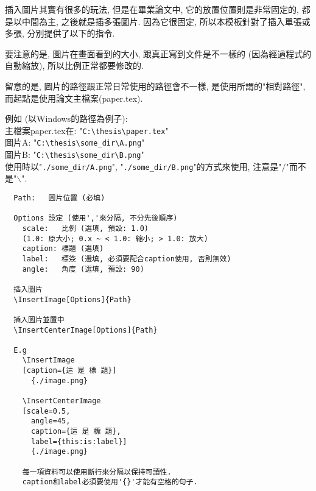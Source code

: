 

插入圖片其實有很多的玩法, 但是在畢業論文中, 它的放置位置則是非常固定的, 都是以中間為主, 之後就是插多張圖片. 因為它很固定, 所以本模板針對了插入單張或多張, 分別提供了以下的指令.

要注意的是, 圖片在畫面看到的大小, 跟真正寫到文件是不一樣的 (因為經過程式的自動縮放), 所以比例正常都要修改的.

留意的是, 圖片的路徑跟正常日常使用的路徑會不一樣, 是使用所謂的"相對路徑", 而起點是使用論文主檔案(paper.tex).

\noindent 例如 (以Windows的路徑為例子):\\
主檔案paper.tex在: "\verb|C:\thesis\paper.tex|"\\
圖片A: "\verb|C:\thesis\some_dir\A.png|"\\
圖片B: "\verb|C:\thesis\some_dir\B.png|"\\
使用時以"\verb|./some_dir/A.png|", "\verb|./some_dir/B.png|"的方式來使用, 注意是"$/$"而不是"$\backslash$".


\newpage
{}

  \begin{framed}
  \begin{verbatim}
  Path:   圖片位置 (必填)

  Options 設定 (使用','來分隔, 不分先後順序)
    scale:   比例 (選填, 預設: 1.0)
    (1.0: 原大小; 0.x ~ < 1.0: 縮小; > 1.0: 放大)
    caption: 標題 (選填)
    label:   標簽 (選填, 必須要配合caption使用, 否則無效)
    angle:   角度 (選填, 預設: 90)

  插入圖片
  \InsertImage[Options]{Path}

  插入圖片並置中
  \InsertCenterImage[Options]{Path}

  E.g
    \InsertImage
    [caption={這 是 標 題}]
      {./image.png}

    \InsertCenterImage
    [scale=0.5,
      angle=45,
      caption={這 是 標 題},
      label={this:is:label}]
      {./image.png}

    每一項資料可以使用斷行來分隔以保持可讀性.
    caption和label必須要使用'{}'才能有空格的句子.
  \end{verbatim}
  \end{framed}

